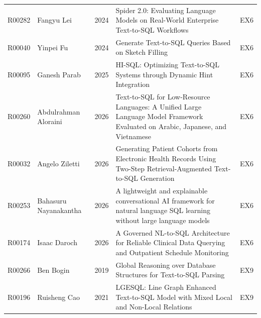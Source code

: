 {\begin{longtable}{@{}l p{3.0cm} l p{11.2cm} l@{}}
R00282 & Fangyu Lei & 2024 & Spider 2.0: Evaluating Language Models on Real-World Enterprise Text-to-SQL Workflows & EX6 \\
R00040 & Yinpei Fu & 2024 & Generate Text-to-SQL Queries Based on Sketch Filling & EX6 \\
R00095 & Ganesh Parab & 2025 & HI-SQL: Optimizing Text-to-SQL Systems through Dynamic Hint Integration & EX6 \\
R00260 & Abdulrahman Aloraini & 2026 & Text-to-SQL for Low-Resource Languages: A Unified Large Language Model Framework Evaluated on Arabic, Japanese, and Vietnamese & EX6 \\
R00032 & Angelo Ziletti & 2026 & Generating Patient Cohorts from Electronic Health Records Using Two-Step Retrieval-Augmented Text-to-SQL Generation & EX6 \\
R00253 & Bahasuru Nayanakantha & 2026 & A lightweight and explainable conversational AI framework for natural language SQL learning without large language models & EX6 \\
R00174 & Isaac Daroch & 2026 & A Governed NL-to-SQL Architecture for Reliable Clinical Data Querying and Outpatient Schedule Monitoring & EX6 \\
R00266 & Ben Bogin & 2019 & Global Reasoning over Database Structures for Text-to-SQL Parsing & EX9 \\
R00196 & Ruisheng Cao & 2021 & LGESQL: Line Graph Enhanced Text-to-SQL Model with Mixed Local and Non-Local Relations & EX9 \\
\end{longtable}
}
